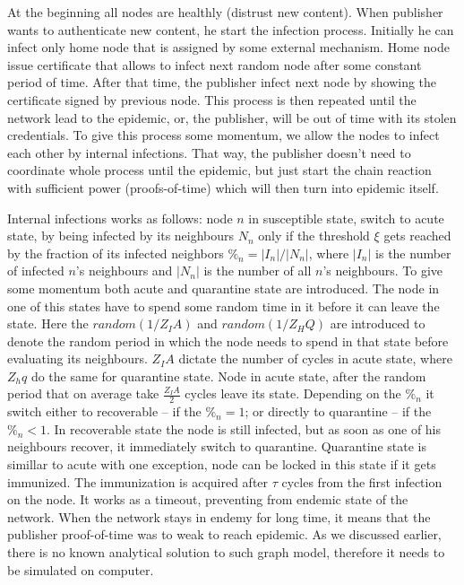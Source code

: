 \documentclass[nostrict]{szablonPG}
\begin{document}
At the beginning all nodes are healthly (distrust new content). When publisher wants to authenticate new content, he start the infection process. Initially he can infect only home node that is assigned by some external mechanism. Home node issue certificate that allows to infect next random node after some constant period of time. After that time, the publisher infect next node by showing the certificate signed by previous node. This process is then repeated until the network lead to the epidemic, or, the publisher, will be out of time with its stolen credentials. To give this process some momentum, we allow the nodes to infect each other by internal infections. That way, the publisher doesn't need to coordinate whole process until the epidemic, but just start the chain reaction with sufficient power (proofs-of-time) which will then turn into epidemic itself.

Internal infections works as follows: node $n$ in susceptible state, switch to acute state, by being infected by its neighbours $N_n$ only if the threshold $\xi$ gets reached by the fraction of its infected neighbors $\%_n = |I_n|/|N_n|$, where $|I_n|$ is the number of infected $n$'s neighbours and $|N_n|$ is the number of all $n$'s neighbours. To give some momentum both acute and quarantine state are introduced. The node in one of this states have to spend some random time in it before it can leave the state. Here the $random(1/Z_IA)$ and $random(1/Z_HQ)$ are introduced to denote the random period in which the node needs to spend in that state before evaluating its neighbours. $Z_IA$ dictate the number of cycles in acute state, where $Z_hq$ do the same for quarantine state. Node in acute state, after the random period that on average take $\frac{Z_IA}{2}$ cycles leave its state. Depending on the $\%_n$ it switch either to recoverable -- if the $\%_n = 1$; or directly to quarantine -- if the $\%_n < 1$. In recoverable state the node is still infected, but as soon as one of his neighbours recover, it immediately switch to quarantine. Quarantine state is simillar to acute with one exception, node can be locked in this state if it gets immunized. The immunization is acquired after $\tau$ cycles from the first infection on the node. It works as a timeout, preventing from endemic state of the network. When the network stays in endemy for long time, it means that the publisher proof-of-time was to weak to reach epidemic. As we discussed earlier, there is no known analytical solution to such graph model, therefore it needs to be simulated on computer.
\end{document}
